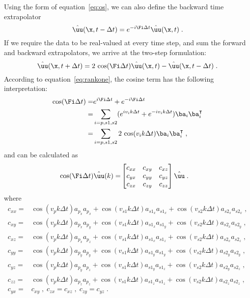 Using the form of equation~\ref{eq:os}, we can also define the backward time extrapolator
\begin{equation}
\label{eq:os-b}
\hat{\uu}(\x,t-\Delta t) = e^{-i\Fi\Delta t} \hat{\uu}(\x,t) \;.
\end{equation}
If we require the data to be real-valued at every time step, and sum the forward and backward extrapolators, we arrive at the two-step formulation:
\begin{equation}
\label{eq:ts}
\hat{\uu} (\x,t+\Delta t) = 2\,\cos(\Fi \Delta t) \hat{\uu}(\x,t) - \hat{\uu}(\x,t-\Delta t) \;.
\end{equation}
According to equation~\ref{eq:rankone}, the cosine term has the following interpretation:
\begin{eqnarray}
    \label{eq:euler}
\cos(\Fi \Delta t) =& e^{i\Fi\Delta t} + e^{-i\Fi\Delta t} \\ \nonumber 
=& \sum\limits_{i=p,s1,s2} (e^{i v_i k \Delta t} + e^{-i v_i k \Delta t}) \ba_i \ba_i^\intercal \\ \nonumber
=& \sum\limits_{i=p,s1,s2} 2\,\cos(v_i k \Delta t) \ba_i \ba_i^\intercal \;,
\end{eqnarray}
and can be calculated as
\begin{eqnarray}
    \label{eq:twostep}
\cos(\Fi \Delta t) \hat{\uu}(k) = &
\begin{bmatrix}
c_{xx} & c_{xy} & c_{xz} \\
c_{yx} & c_{yy} & c_{yz} \\
c_{zx} & c_{zy} & c_{zz} \\
\end{bmatrix} \hat{\uu} \;.
\end{eqnarray}
where
\begin{eqnarray}
    \label{eq:cosines}
c_{xx} =& \cos(v_p k \Delta t) a_{p_x} a_{p_x} + \cos(v_{s1} k \Delta t) a_{s1_x} a_{s1_x} + \cos(v_{s2} k \Delta t) a_{s2_x} a_{s2_x} \;, \\ \nonumber
c_{xy} =& \cos(v_p k \Delta t) a_{p_x} a_{p_y} + \cos(v_{s1} k \Delta t) a_{s1_x} a_{s1_y} + \cos(v_{s2} k \Delta t) a_{s2_x} a_{s2_y} \;, \\ \nonumber
c_{xz} =& \cos(v_p k \Delta t) a_{p_x} a_{p_z} + \cos(v_{s1} k \Delta t) a_{s1_x} a_{s1_z} + \cos(v_{s2} k \Delta t) a_{s2_x} a_{s2_z} \;, \\ \nonumber
c_{yy} =& \cos(v_p k \Delta t) a_{p_y} a_{p_y} + \cos(v_{s1} k \Delta t) a_{s1_y} a_{s1_y} + \cos(v_{s2} k \Delta t) a_{s2_y} a_{s2_y} \;, \\ \nonumber
c_{yz} =& \cos(v_p k \Delta t) a_{p_y} a_{p_z} + \cos(v_{s1} k \Delta t) a_{s1_y} a_{s1_z} + \cos(v_{s2} k \Delta t) a_{s2_y} a_{s2_z} \;, \\ \nonumber
c_{zz} =& \cos(v_p k \Delta t) a_{p_z} a_{p_z} + \cos(v_{s1} k \Delta t) a_{s1_z} a_{s1_z} + \cos(v_{s2} k \Delta t) a_{s2_z} a_{s2_z} \;, \\ \nonumber
c_{yx} =& c_{xy} \;,\; c_{zx} = c_{xz} \;,\; c_{zy} = c_{yz} \;.
\end{eqnarray}
